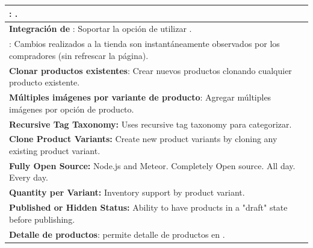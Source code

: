\begin{table}[h!]
\begin{tabular}{ |L{0.6\paperwidth}|L{0.1\paperwidth}|}
\\ \hline
	\textbf{ \googleanalytics}: \outofthebox \googleanalytics \event \tracking.&
		
\\ \hline
	\textbf{ Integración de \paypal}: Soportar la opción de utilizar \paypal \checkout.&
		
\\ \hline
	\textbf{\realtime \itemupdates}: Cambios realizados a la tienda son instantáneamente observados por los compradores (sin refrescar la página).&
		
\\ \hline
	\textbf{Clonar productos existentes}: Crear nuevos productos clonando cualquier producto existente.&
		
\\ \hline
	\textbf{Múltiples imágenes por variante de producto}: Agregar múltiples imágenes por opción de producto.&
		
\\ \hline
	\textbf{ Recursive Tag Taxonomy:} Uses recursive tag taxonomy para categorizar.&	
		
\\ \hline
	 \textbf{ Clone Product Variants:} Create new product variants by cloning any existing product variant.&
	
\\ \hline
	\textbf{ Fully Open Source:} Node.js and Meteor. Completely Open source. All day. Every day.&
	
\\ \hline
	\textbf{ Quantity per Variant:} Inventory support by product variant.&
	
\\ \hline
	\textbf{ Published or Hidden Status:} Ability to have products in a "draft" state before publishing.&
	
\\ \hline
	\textbf{ Detalle de productos}: permite detalle de productos en \keyValue \listhighlevel .&
	

\end{tabular}
\end{table}
